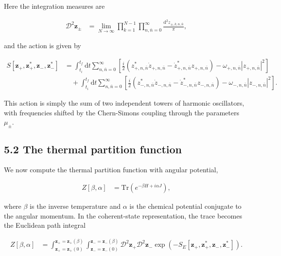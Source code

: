 Here the integration measures are

\begin{align}
\mathcal{D}^{2}\boldsymbol{z}_{\pm} & =\lim_{ N \to \infty } \prod ^{N-1}_{k=1}\prod ^{\infty}_{n,\bar{n}=0}\frac{\mathrm{d}^{2}z_{\pm,k,n,\bar{n}}}{\pi},
\end{align}

and the action is given by

\begin{align}
S[\boldsymbol{z}_{+},\boldsymbol{z}^{*}_{+},\boldsymbol{z}_{-},\boldsymbol{z}^{*}_{-}] & =\int ^{t_{f}}_{t_{i}}\mathrm{d}t\sum ^{\infty}_{n,\bar{n}=0}\left[\frac{i}{2}\left(z^{*}_{+,n,\bar{n}}\dot{z}_{+,n,\bar{n}}-\dot{z}^{*}_{+,n,\bar{n}}z_{+,n,\bar{n}}\right)-\omega _{+,n,\bar{n}}|z_{+,n,\bar{n}}|^{2}\right] \\
& \quad +\int ^{t_{f}}_{t_{i}}\mathrm{d}t\sum ^{\infty}_{n,\bar{n}=0}\left[\frac{i}{2}\left(z^{*}_{-,n,\bar{n}}\dot{z}_{-,n,\bar{n}}-\dot{z}^{*}_{-,n,\bar{n}}z_{-,n,\bar{n}}\right)-\omega _{-,n,\bar{n}}|z_{-,n,\bar{n}}|^{2}\right].
\end{align}

This action is simply the sum of two independent towers of harmonic oscillators, with frequencies shifted by the Chern-Simons coupling through the parameters $\mu _{\pm}$.

\subsection{5.2 The thermal partition function}\label{subsec:thermal-partition-function}

We now compute the thermal partition function with angular potential,

\begin{align}
Z[\beta,\alpha] & =\mathrm{Tr}\left( e^{-\beta H+i\alpha J} \right),
\end{align}

where $\beta$ is the inverse temperature and $\alpha$ is the chemical potential conjugate to the angular momentum. In the coherent-state representation, the trace becomes the Euclidean path integral

\begin{align}
Z[\beta,\alpha] & =\int _{\boldsymbol{z}_{+}=\boldsymbol{z}_{+}(0)}^{\boldsymbol{z}_{+}=\boldsymbol{z}_{+}(\beta)}\int _{\boldsymbol{z}_{-}=\boldsymbol{z}_{-}(0)}^{\boldsymbol{z}_{-}=\boldsymbol{z}_{-}(\beta)} \mathcal{D}^{2}\boldsymbol{z}_{+}\mathcal{D}^{2}\boldsymbol{z}_{-}\exp\left(-S_{E}[\boldsymbol{z}_{+},\boldsymbol{z}^{*}_{+},\boldsymbol{z}_{-},\boldsymbol{z}^{*}_{-}]\right).
\end{align}


